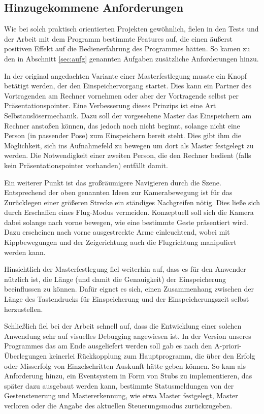 	\subsection{Hinzugekommene Anforderungen}
	Wie bei solch praktisch orientierten Projekten gewöhnlich, fielen in den Tests und der Arbeit mit dem Programm bestimmte Features auf, die einen äußerst positiven Effekt auf die Bedienerfahrung des Programmes hätten. So kamen zu den in Abschnitt \ref{sec:aufg} genannten Aufgaben zusätzliche Anforderungen hinzu.\par
	In der original angedachten Variante einer Masterfestlegung musste ein Knopf betätigt werden, der den Einspeichervorgang startet. Dies kann ein Partner des Vortragenden am Rechner vornehmen oder aber der Vortragende selbst per Präsentationspointer. Eine Verbesserung dieses Prinzips ist eine Art Selbstauslösermechanik. Dazu soll der vorgesehene Master das Einspeichern am Rechner anstoßen können, das jedoch noch nicht beginnt, solange nicht eine Person (in passender Pose) zum Einspeichern bereit steht. Dies gibt ihm die Möglichkeit, sich ins Aufnahmefeld zu bewegen um dort als Master festgelegt zu werden. Die Notwendigkeit einer zweiten Person, die den Rechner bedient (falls kein Präsentationspointer vorhanden) entfällt damit.\par 
	Ein weiterer Punkt ist das großräumigere Navigieren durch die Szene. Entsprechend der oben genannten Ideen zur Kamerabewegung ist für das Zurücklegen einer größeren Strecke ein ständiges Nachgreifen nötig. Dies ließe sich durch Erschaffen eines \glqq{}Flug-Modus\grqq{} vermeiden. Konzeptuell soll sich die Kamera dabei solange nach vorne bewegen, wie eine bestimmte Geste präsentiert wird. Dazu erscheinen nach vorne ausgestreckte Arme einleuchtend, wobei mit Kippbewegungen und der Zeigerichtung auch die Flugrichtung manipuliert werden kann.\par
	Hinsichtlich der Masterfestlegung fiel weiterhin auf, dass es für den Anwender nützlich ist, die Länge (und damit die Genauigkeit) der Einspeicherung beeinflussen zu können. Dafür eignet es sich, einen Zusammenhang zwischen der Länge des Tastendrucks für Einspeicherung und der Einspeicherungszeit selbst herzustellen.\par
	Schließlich fiel bei der Arbeit schnell auf, dass die Entwicklung einer solchen Anwendung sehr auf visuelles Debugging angewiesen ist. In der Version unseres Programmes das am Ende ausgeliefert werden soll gab es nach den A-priori-Überlegungen keinerlei Rückkopplung zum Hauptprogramm, die über den Erfolg oder Misserfolg von Einzelschritten Auskunft hätte geben können. So kam als Anforderung hinzu, ein Eventsystem in Form von Stubs zu implementieren, das später dazu ausgebaut werden kann, bestimmte Statusmeldungen von der Gestensteuerung und Mastererkennung, wie etwa \glqq{}Master festgelegt\grqq{}, \glqq{}Master verloren\grqq{} oder die Angabe des aktuellen Steuerungsmodus zurückzugeben.
